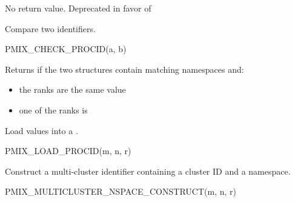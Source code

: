 No return value. Deprecated in favor of 


Compare two  identifiers.

\cspecificstart
\begin{codepar}
PMIX_CHECK_PROCID(a, b)
\end{codepar}
\cspecificend

\begin{arglist}
\end{arglist}

Returns  if the two structures contain matching namespaces and:

\begin{itemize}
    \item the ranks are the same value
    \item one of the ranks is 
\end{itemize}



Load values into a .

\cspecificstart
\begin{codepar}
PMIX_LOAD_PROCID(m, n, r)
\end{codepar}
\cspecificend

\begin{arglist}
\end{arglist}


Construct a multi-cluster identifier containing a cluster ID and a namespace.

\cspecificstart
\begin{codepar}
PMIX_MULTICLUSTER_NSPACE_CONSTRUCT(m, n, r)
\end{codepar}
\cspecificend

